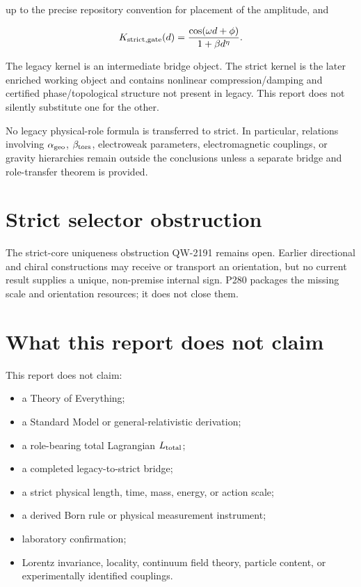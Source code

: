 \documentclass[11pt,a4paper,openany]{report}
\begin{document}
up to the precise repository convention for placement of the amplitude, and

\[
K_{\rm strict,gate}(d)
=
\frac{\cos(\omega d+\phi)}
{1+\beta d^\eta}.
\]

The legacy kernel is an intermediate bridge object. The strict kernel is the later enriched working object and contains nonlinear compression/\allowbreak{}damping and certified phase/\allowbreak{}topological structure not present in legacy. This report does not silently substitute one for the other.

No legacy physical-role formula is transferred to strict. In particular, relations involving \(\alpha_{\rm geo}\), \(\beta_{\rm tors}\), electroweak parameters, electromagnetic couplings, or gravity hierarchies remain outside the conclusions unless a separate bridge and role-transfer theorem is provided.

\section{Strict selector obstruction}

The strict-core uniqueness obstruction QW-2191 remains open. Earlier directional and chiral constructions may receive or transport an orientation, but no current result supplies a unique, non-premise internal sign. P280 packages the missing scale and orientation resources; it does not close them.

\section{What this report does not claim}

This report does not claim:

\begin{itemize}
\item 
a Theory of Everything;

\item 
a Standard Model or general-relativistic derivation;

\item 
a role-bearing total Lagrangian \(L_{\rm total}\);

\item 
a completed legacy-to-strict bridge;

\item 
a strict physical length, time, mass, energy, or action scale;

\item 
a derived Born rule or physical measurement instrument;

\item 
laboratory confirmation;

\item 
Lorentz invariance, locality, continuum field theory, particle content, or experimentally identified couplings.

\end{itemize}
\end{document}
